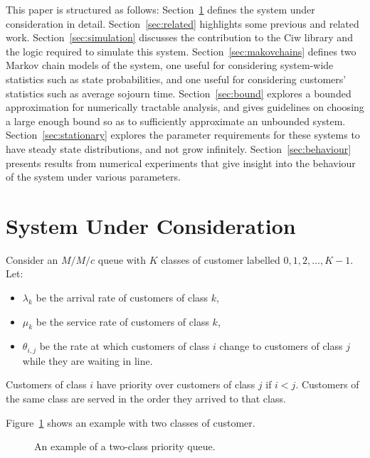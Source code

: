 \documentclass{article}
\begin{document}
This paper is structured as follows:
Section~\ref{sec:system} defines the system under consideration in detail.
Section~\ref{sec:related} highlights some previous and related work.
Section~\ref{sec:simulation} discusses the contribution to the Ciw library and
the logic required to simulate this system.
Section~\ref{sec:makovchains} defines two Markov chain models of the system, one
useful for considering system-wide statistics such as state probabilities, and
one useful for considering customers' statistics such as average sojourn time.
Section~\ref{sec:bound} explores a bounded approximation for numerically
tractable analysis, and gives guidelines on choosing a large enough bound so as
to sufficiently approximate an unbounded system.
Section~\ref{sec:stationary} explores the parameter requirements for these
systems to have steady state distributions, and not grow infinitely.
Section~\ref{sec:behaviour} presents results from numerical experiments that
give insight into the behaviour of the system under various parameters.




\section{System Under Consideration}\label{sec:system}
Consider an $M/M/c$ queue with $K$ classes of customer labelled
$0, 1, 2, \dots, K-1$.
Let:

\begin{itemize}
  \item $\lambda_k$ be the arrival rate of customers of class $k$,
  \item $\mu_k$ be the service rate of customers of class $k$,
  \item $\theta_{i,j}$ be the rate at which customers of class $i$ change
  to customers of class $j$ while they are waiting in line.
\end{itemize}

Customers of class $i$ have priority over customers of class $j$ if $i < j$.
Customers of the same class are served in the order they arrived to that class.

Figure~\ref{fig:twoclass_example} shows an example with two classes of customer.

\begin{figure}
\begin{center}

\end{center}
\caption{An example of a two-class priority queue.}
\label{fig:twoclass_example}
\end{figure}
\end{document}
